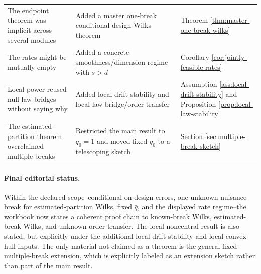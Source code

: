 \documentclass[12pt]{article}
\numberwithin{equation}{section}
\theoremstyle{definition}
\begin{document}
\begin{center}
\begin{tabular}{>{\raggedright\arraybackslash}p{}
                >{\raggedright\arraybackslash}p{}
                >{\raggedright\arraybackslash}p{}}
The endpoint theorem was implicit across several modules & Added a master one-break conditional-design Wilks theorem & Theorem \ref{thm:master-one-break-wilks} \\
The rates might be mutually empty & Added a concrete smoothness/dimension regime with \(s>d\) & Corollary \ref{cor:jointly-feasible-rates} \\
Local power reused null-law bridges without saying why & Added local drift stability and local-law bridge/order transfer & Assumption \ref{ass:local-drift-stability} and Proposition \ref{prop:local-law-stability} \\
The estimated-partition theorem overclaimed multiple breaks & Restricted the main result to \(q_0=1\) and moved fixed-\(q_0\) to a telescoping sketch & Section \ref{sec:multiple-break-sketch} \\
\hline
\end{tabular}
\end{center}

\paragraph{Final editorial status.}
Within the declared scope--conditional-on-design errors, one unknown nuisance
break for estimated-partition Wilks, fixed \(\bar q\), and the displayed rate
regime--the workbook now states a coherent proof chain to known-break Wilks,
estimated-break Wilks, and unknown-order transfer.  The local noncentral result
is also stated, but explicitly under the additional local drift-stability and
local convex-hull inputs.  The only material not claimed as a theorem is the
general fixed-multiple-break extension, which is explicitly labeled as an
extension sketch rather than part of the main result.
\end{document}

